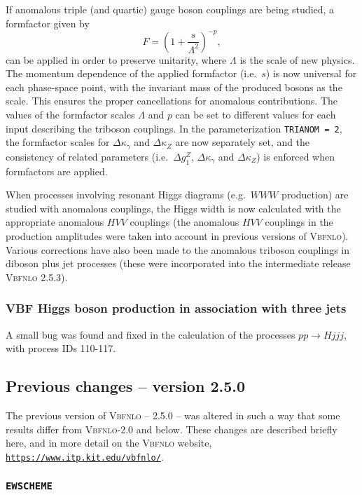 \documentclass[english,12pt]{article}
\begin{document}
If anomalous triple (and quartic) gauge boson couplings are being studied, a formfactor given by
\begin{equation}
 F = \left(1 + \frac{s}{\Lambda^{2}} \right)^{-p},
\end{equation}
can be applied in order to preserve unitarity, where $\Lambda$ is the scale of new physics.  
The momentum dependence of the applied formfactor (i.e.\ $s$) is now universal for each phase-space point, with the invariant mass of the produced bosons as the scale.  This ensures the proper cancellations for anomalous contributions.  The values of the formfactor scales $\Lambda$ and $p$ can be set to different values for each input describing the triboson couplings.  In the parameterization {\tt TRIANOM = 2}, the formfactor scales for $\Delta \kappa_{\gamma}$ and $\Delta \kappa_{Z}$ are now separately set, and the consistency of related parameters  (i.e.\ $\Delta g_{1}^{Z}$, $\Delta \kappa_{\gamma}$ and $\Delta \kappa_{Z}$) is enforced when formfactors are applied.

When processes involving resonant Higgs diagrams (e.g.\ $WWW$ production) are studied with anomalous couplings, the Higgs width is now calculated with the appropriate anomalous $HVV$ couplings (the anomalous $HVV$ couplings in the production amplitudes were taken into account in previous versions of \textsc{Vbfnlo}).  Various corrections have also been made to the anomalous triboson couplings in diboson plus jet processes (these were incorporated into the intermediate release \textsc{Vbfnlo} 2.5.3).

\subsubsection{VBF Higgs boson production in association with three jets}
A small bug was found and fixed in the calculation of the processes $pp \rightarrow H jjj$, with process IDs 110-117.


\subsection{Previous changes -- version 2.5.0}

The previous version of \textsc{Vbfnlo -- 2.5.0} -- was altered in such a
way that some results differ from \textsc{Vbfnlo-2.0} and below.  These changes are
described briefly here, and in more detail on the \textsc{Vbfnlo} website, {\tt
\url{https://www.itp.kit.edu/vbfnlo/}}.


\subsubsection{{\tt EWSCHEME}}
\end{document}
